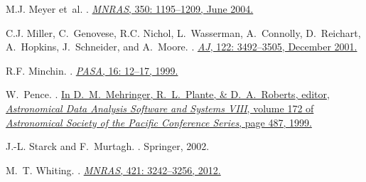\begin{thebibliography}{12}
M.J. {Meyer} et~al.
.
\href{http://adsabs.harvard.edu/cgi-bin/nph-bib_query?bibcode=2004MNRAS.350.1%
195M&db_key=AST}%
{{\em MNRAS}, 350: 1195--1209, June 2004.}

C.J. {Miller}, C.~{Genovese}, R.C. {Nichol}, L.~{Wasserman}, A.~{Connolly},
  D.~{Reichart}, A.~{Hopkins}, J.~{Schneider}, and A.~{Moore}.
.
\newblock 
\href{http://adsabs.harvard.edu/cgi-bin/nph-bib_query?bibcode=2001AJ....122.3%
492M&db_key=AST}%
{{\em AJ}, 122: 3492--3505, December 2001.}

R.F. Minchin.
.
\newblock \href{http://adsabs.harvard.edu/abs/1999PASA...16...12M}{{\em PASA}, 16: 12--17, 1999.}

W.~{Pence}.
.
\newblock \href{http://adass.org/adass/proceedings/adass98/pencewd/}%
{In {D.~M.~Mehringer, R.~L.~Plante, \& D.~A.~Roberts}, editor,
  \emph{Astronomical Data Analysis Software and Systems VIII}, volume 172 of
  \emph{Astronomical Society of the Pacific Conference Series}, page 487, 1999.}

J.-L. Starck and F.~Murtagh.
.
\newblock Springer, 2002.

M.~T. Whiting.
.
\newblock \href{http://onlinelibrary.wiley.com/doi/10.1111/j.1365-2966.2012.20548.x/full}%
{\emph{MNRAS}, 421: 3242--3256, 2012.}

\end{thebibliography}
